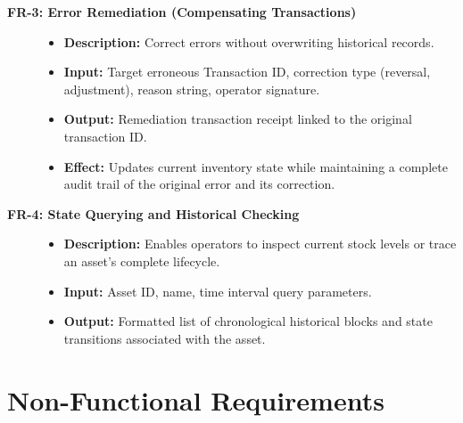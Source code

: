 \documentclass[11pt,a4paper]{memoir}
\begin{document}
\begin{description}
    \item[\textbf{FR-3: Error Remediation (Compensating Transactions)}]\hfill
    \begin{itemize}
        \item \textbf{Description:} Correct errors without overwriting historical records.
        \item \textbf{Input:} Target erroneous Transaction ID, correction type (reversal, adjustment), reason string, operator signature.
        \item \textbf{Output:} Remediation transaction receipt linked to the original transaction ID.
        \item \textbf{Effect:} Updates current inventory state while maintaining a complete audit trail of the original error and its correction.
    \end{itemize}

    \item[\textbf{FR-4: State Querying and Historical Checking}]\hfill
    \begin{itemize}
        \item \textbf{Description:} Enables operators to inspect current stock levels or trace an asset's complete lifecycle.
        \item \textbf{Input:} Asset ID, name, time interval query parameters.
        \item \textbf{Output:} Formatted list of chronological historical blocks and state transitions associated with the asset.
    \end{itemize}
\end{description}

\section{Non-Functional Requirements}
\end{document}
